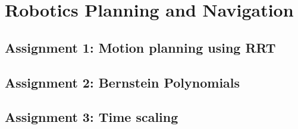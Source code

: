 \section{Robotics Planning and Navigation}

\subsection{Assignment 1: Motion planning using RRT}

\subsection{Assignment 2: Bernstein Polynomials}

\subsection{Assignment 3: Time scaling}

